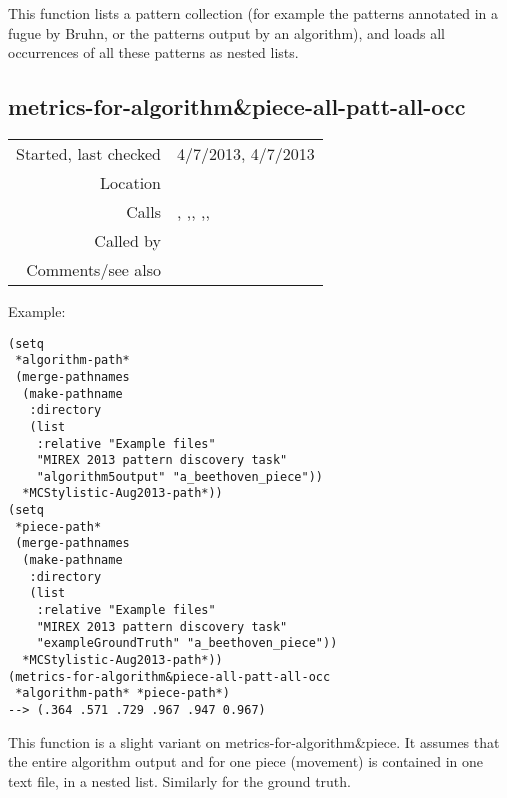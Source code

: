 \noindent This function lists a pattern collection
(for example the patterns annotated in a fugue by
Bruhn, or the patterns output by an algorithm), and
loads all occurrences of all these patterns as nested
lists.


\subsection*{metrics-for-algorithm\&piece-all-patt-all-occ}\label{fun:metrics-for-algorithmnpiece-all-patt-all-occ}

\vspace{0.3cm}
\begin{tabular}{r|p{8cm}}
Started, last checked & 4/7/2013, 4/7/2013 \\
Location & \nameref{sec:evaluate-discovered-versus-annotated-patterns} \\
Calls & \nameref{fun:establishment-metric}, \nameref{fun:occurrence-metric},\newline \nameref{fun:nth-list-of-lists}, \nameref{fun:max-item},\newline \nameref{fun:read-ground-truth-for-piece},\newline \nameref{fun:read-pattsnoccs} \\
Called by & \nameref{fun:pattern-discovery-metrics} \\
Comments/see also & \nameref{fun:metrics-for-algorithmnpiece}
\end{tabular}

\vspace{0.5cm}
\noindent Example:
\begin{verbatim}
(setq
 *algorithm-path*
 (merge-pathnames
  (make-pathname
   :directory
   (list
    :relative "Example files"
    "MIREX 2013 pattern discovery task" 
    "algorithm5output" "a_beethoven_piece"))
  *MCStylistic-Aug2013-path*))
(setq
 *piece-path*
 (merge-pathnames
  (make-pathname
   :directory
   (list
    :relative "Example files"
    "MIREX 2013 pattern discovery task"
    "exampleGroundTruth" "a_beethoven_piece"))
  *MCStylistic-Aug2013-path*))
(metrics-for-algorithm&piece-all-patt-all-occ
 *algorithm-path* *piece-path*)
--> (.364 .571 .729 .967 .947 0.967)
\end{verbatim}

\noindent This function is a slight variant on
metrics-for-algorithm\&piece. It assumes that the
entire algorithm output and for one piece (movement)
is contained in one text file, in a nested list.
Similarly for the ground truth.


